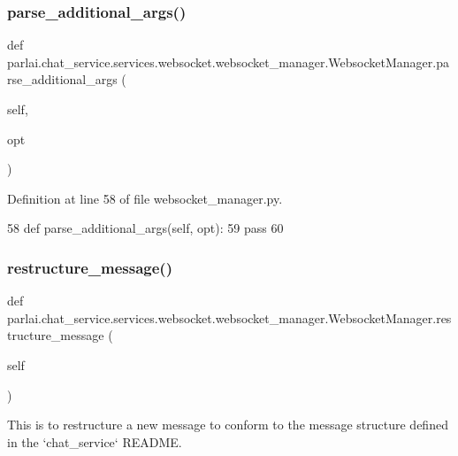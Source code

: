 \subsubsection{\texorpdfstring{parse\+\_\+additional\+\_\+args()}{parse\_additional\_args()}}
{\footnotesize\ttfamily def parlai.\+chat\+\_\+service.\+services.\+websocket.\+websocket\+\_\+manager.\+Websocket\+Manager.\+parse\+\_\+additional\+\_\+args (\begin{DoxyParamCaption}\item[{}]{self,  }\item[{}]{opt }\end{DoxyParamCaption})}



Definition at line 58 of file websocket\+\_\+manager.\+py.


\begin{DoxyCode}
58     \textcolor{keyword}{def }parse\_additional\_args(self, opt):
59         \textcolor{keywordflow}{pass}
60 
\end{DoxyCode}
\mbox{\label{classparlai_1_1chat__service_1_1services_1_1websocket_1_1websocket__manager_1_1WebsocketManager_ab50f384331aea23175f690642717958a}} 
\subsubsection{\texorpdfstring{restructure\+\_\+message()}{restructure\_message()}}
{\footnotesize\ttfamily def parlai.\+chat\+\_\+service.\+services.\+websocket.\+websocket\+\_\+manager.\+Websocket\+Manager.\+restructure\+\_\+message (\begin{DoxyParamCaption}\item[{}]{self }\end{DoxyParamCaption})}

\begin{DoxyVerb}This is to restructure a new message to conform to the message structure defined
in the `chat_service` README.
\end{DoxyVerb}
 

